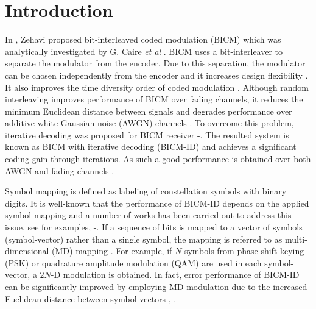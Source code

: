 \documentclass[12pt, draftclsnofoot, onecolumn]{IEEEtran}
\begin{document}
\section{Introduction}
\label{sec:intro}
In \cite{Zehavi}, Zehavi proposed bit-interleaved coded modulation (BICM) which was analytically investigated by G. Caire \emph{et al} \cite{BICM}. BICM uses a bit-interleaver to separate the modulator from the encoder. Due to this separation, the modulator can be chosen independently from the encoder and it increases  design flexibility \cite{BICM}. It also improves the time diversity order of coded modulation \cite{Zehavi}.  Although random interleaving improves performance of BICM over fading channels, it reduces the  minimum  Euclidean distance between signals and degrades performance over additive white Gaussian noise (AWGN) channels \cite{8PSK_signaling}.  To overcome this problem, iterative decoding was proposed for BICM receiver \cite{BICMID}-\cite{Benedetto}. The resulted system is known as BICM with iterative decoding (BICM-ID) and achieves a significant coding gain through  iterations. As such a good performance is obtained over both AWGN and fading channels \cite{BICM-ID-good-AW-Ray}. %

 Symbol mapping is defined as labeling of constellation symbols with binary digits. It is well-known that \color{black}the performance of BICM-ID  depends on the applied symbol mapping  and a number of works has been carried out to address this issue, see for examples, \cite{BICM-ID-good-AW-Ray}-\cite{MDQAM}. 
   If a sequence of bits is mapped to a vector of symbols (symbol-vector)  rather than a single symbol, 
 the mapping is referred to as 
  multi-dimensional (MD) mapping \cite{MD-BQPSK-Simoen}.
  For example, if $N$ symbols from  phase shift keying (PSK) or quadrature amplitude modulation (QAM) are used in 
 each symbol-vector, a $2N$-D modulation is obtained. In fact, error performance of BICM-ID can be
significantly improved by employing MD modulation due to the increased 
  Euclidean distance between symbol-vectors \cite{MD-BQPSK-Simoen}, \cite{MDQAM}.\color{black}
   
\end{document}
